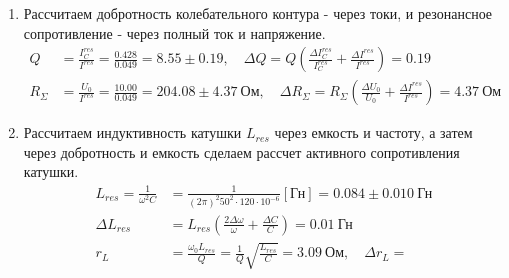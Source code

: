 \documentclass[a4paper, 12pt]{article}
\begin{document}
\begin{enumerate}
\begin{table}[htbp]
        \label{резонансные токи на катушке, конденсаторе и в цепи}
    \end{table}
    \item Рассчитаем добротность колебательного контура - через токи, и резонансное сопротивление - через полный ток и напряжение.
    \begin{align}
        Q &= \frac{I^{res}_{C}}{I^{res}} = \frac{0.428}{0.049} = 8.55 \pm 0.19, \quad \Delta Q = Q\left(\frac{\Delta I^{res}_{C}}{I^{res}_{C}} + \frac{\Delta I^{res}}{I^{res}}\right) = 0.19\\
        R_{\Sigma} &= \frac{U_{0}}{I^{res}} = \frac{10.00}{0.049} = 204.08 \pm 4.37\ \text{Ом}, \quad \Delta R_{\Sigma} = R_{\Sigma}\left(\frac{\Delta U_{0}}{U_{0}} + \frac{\Delta I^{res}}{I^{res}}\right) = 4.37\ \text{Ом}
    \end{align}
    \item Рассчитаем индуктивность катушки $L_{res}$ через емкость и частоту, а затем через добротность и емкость сделаем рассчет активного
    сопротивления катушки.
    \begin{align}
        L_{res} = \frac{1}{\omega^{2}C} & = \frac{1}{(2\pi)^{2}50^{2}\cdot 120\cdot 10^{-6}}[\text{Гн}] = 0.084\pm 0.010\ \text{Гн}\\
        \Delta L_{res} & = L_{res}\left(\frac{2\Delta \omega}{\omega} + \frac{\Delta C}{C}\right) = 0.01\ \text{Гн}\\
        r_L & = \frac{\omega_0 L_{res}}{Q} = \frac{1}{Q} \sqrt{\frac{L_{res}}{C}} = 3.09\ \text{Ом}, \quad \Delta r_L = 
    \end{align}
\end{enumerate}
\end{document}
